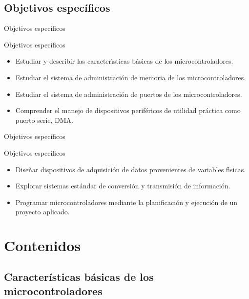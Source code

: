 \documentclass[xcolor=dvipsnames]{beamer}
\newcommand{\pageframe}[1]{\frame{\begin{center}{ \Huge #1 }\end{center}}}
\begin{document}
\subsection{Objetivos específicos}

\begin{frame}{Objetivos específicos}
  \begin{block}{Objetivos específicos}
    \begin{itemize}
      \item<1> Estudiar y describir las caracter\'\i sticas b\'asicas de los microcontroladores.
      \item<1> Estudiar el sistema de administraci\'on de memoria de los microcontroladores.
      \item<1> Estudiar el sistema de administraci\'on de puertos de los microcontroladores.
      \item<1> Comprender el manejo de dispositivos perif\'ericos de utilidad pr\'actica como puerto serie, DMA.
    \end{itemize}
  \end{block}
\end{frame}
\begin{frame}{Objetivos específicos}
  \begin{block}{Objetivos específicos}
    \begin{itemize}
      \item Dise\~nar dispositivos de adquisici\'on de datos provenientes de variables f\'\i sicas.
      \item Explorar sistemas est\'andar de conversi\'on y transmisi\'on de informaci\'on.
      \item Programar microcontroladores mediante la planificaci\'on y ejecuci\'on de un proyecto aplicado.
    \end{itemize}
  \end{block}
\end{frame}

\section{Contenidos}

\pageframe{Contenidos}

\subsection[Características]{Características básicas de los microcontroladores}
\end{document}
